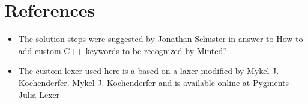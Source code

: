 \documentclass[a4paper,11pt]{scrartcl}
\begin{document}
\section{References}
\begin{itemize}
	\item The solution steps  were suggested by 
	\href{https://tex.stackexchange.com/users/11030/jonathan-schuster}{Jonathan Schuster} in answer to  \href{https://tex.stackexchange.com/questions/18083/how-to-add-custom-c-keywords-to-be-recognized-by-minted#comment930474_42392}{How to add custom C++ keywords to be recognized by Minted?}
	\item  The custom lexer used here is a based on a laxer  modified by  Mykel J. Kochenderfer. \href{https://mykel.kochenderfer.com/}{Mykel J. Kochenderfer} and is available online  at \href{https://github.com/sisl/pygments-julia/tree/f2d897ceb5d66fa83fb1870ac047ff19987acc88}{Pygments Julia Lexer}
\end{itemize}
\end{document}
